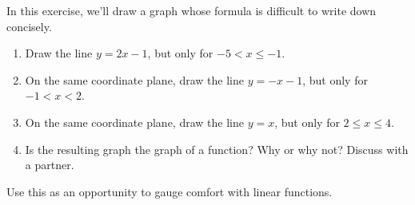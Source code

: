 \documentclass[noauthor,noinstructornotes]{ximera}
\begin{document}
\begin{problem}
In this exercise, we'll draw a graph whose formula is 
difficult to write down concisely.

\begin{enumerate}
    \item Draw the line \(y = 2x - 1\), but only for
    \(-5 < x \le -1\).
    \item On the same coordinate plane, draw the line 
    \(y = -x - 1\), but only for \(-1 < x < 2\).
    \item On the same coordinate plane, draw the line \(y = x\),
    but only for \(2 \le x \le 4\).
    \item Is the resulting graph the graph of a function? Why or
    why not? Discuss with a partner.
\end{enumerate}

\begin{instructorNotes}
Use this as an opportunity to gauge comfort with linear functions.
\end{instructorNotes}
\end{problem}
\end{document}
